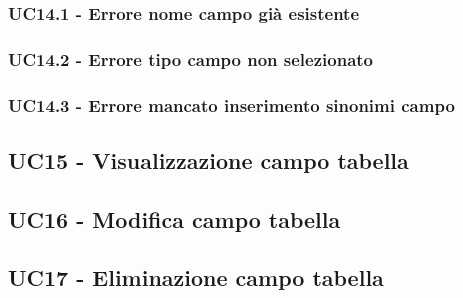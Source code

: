 \documentclass[5pt]{article}
\begin{document}
\subsubsection{UC14.1 - Errore nome campo già esistente}
\label{sec:UC14.1}

\subsubsection{UC14.2 - Errore tipo campo non selezionato}
\label{sec:UC14.2}

\subsubsection{UC14.3 - Errore mancato inserimento sinonimi campo}
\label{sec:UC14.3}

\subsection{UC15 - Visualizzazione campo tabella}
\label{sec:UC15}

\subsection{UC16 - Modifica campo tabella}
\label{sec:UC16}

\subsection{UC17 - Eliminazione campo tabella}
\label{sec:UC17}
\end{document}
